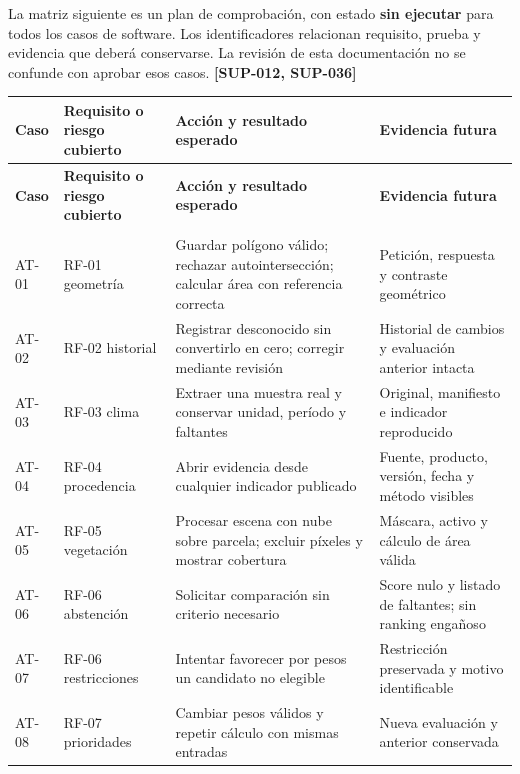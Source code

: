 \documentclass[10pt,a4paper]{article}
\begin{document}
La matriz siguiente es un plan de comprobación, con estado \textbf{sin ejecutar} para todos los casos de software. Los identificadores relacionan requisito, prueba y evidencia que deberá conservarse. La revisión de esta documentación no se confunde con aprobar esos casos. \textbf{[SUP-012, SUP-036]}


\begingroup\small
\begin{longtable}{>{\raggedright\arraybackslash}p{3.115cm}>{\raggedright\arraybackslash}p{3.582cm}>{\raggedright\arraybackslash}p{4.517cm}>{\raggedright\arraybackslash}p{4.361cm}}
\toprule
\textbf{Caso} & \textbf{Requisito o riesgo cubierto} & \textbf{Acción y resultado esperado} & \textbf{Evidencia futura} \\
\midrule\endfirsthead
\toprule
\textbf{Caso} & \textbf{Requisito o riesgo cubierto} & \textbf{Acción y resultado esperado} & \textbf{Evidencia futura} \\
\midrule\endhead
\midrule\multicolumn{4}{r}{\scriptsize Continúa en la página siguiente}\\\endfoot
\bottomrule\endlastfoot
AT-01 & RF-01 geometría & Guardar polígono válido; rechazar autointersección; calcular área con referencia correcta & Petición, respuesta y contraste geométrico \\[3pt]
AT-02 & RF-02 historial & Registrar desconocido sin convertirlo en cero; corregir mediante revisión & Historial de cambios y evaluación anterior intacta \\[3pt]
AT-03 & RF-03 clima & Extraer una muestra real y conservar unidad, período y faltantes & Original, manifiesto e indicador reproducido \\[3pt]
AT-04 & RF-04 procedencia & Abrir evidencia desde cualquier indicador publicado & Fuente, producto, versión, fecha y método visibles \\[3pt]
AT-05 & RF-05 vegetación & Procesar escena con nube sobre parcela; excluir píxeles y mostrar cobertura & Máscara, activo y cálculo de área válida \\[3pt]
AT-06 & RF-06 abstención & Solicitar comparación sin criterio necesario & Score nulo y listado de faltantes; sin ranking engañoso \\[3pt]
AT-07 & RF-06 restricciones & Intentar favorecer por pesos un candidato no elegible & Restricción preservada y motivo identificable \\[3pt]
AT-08 & RF-07 prioridades & Cambiar pesos válidos y repetir cálculo con mismas entradas & Nueva evaluación y anterior conservada \\[3pt]

\end{longtable}
\end{document}
